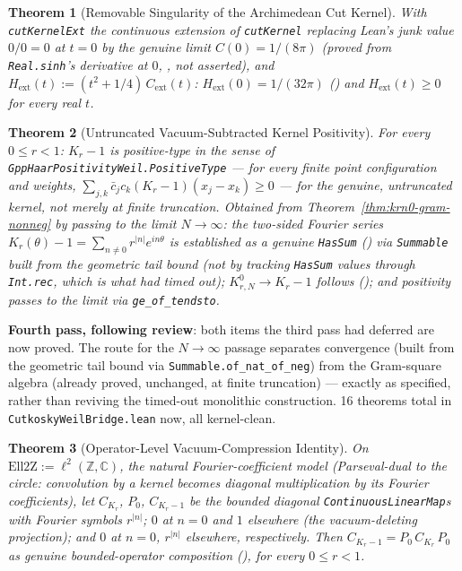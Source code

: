 \documentclass{report}
\newtheorem{theorem}{Theorem}[chapter]
\theoremstyle{definition}
\begin{document}
\begin{theorem}[Removable Singularity of the Archimedean Cut Kernel]
  \label{thm:hext-nonneg}
  \leanok
  With \texttt{cutKernelExt} the continuous extension of \texttt{cutKernel} replacing
  Lean's junk value $0/0=0$ at $t=0$ by the genuine limit $C(0)=1/(8\pi)$ (proved from
  \texttt{Real.sinh}'s derivative at $0$, ,
  not asserted), and $H_{\mathrm{ext}}(t):=(t^2+1/4)\,C_{\mathrm{ext}}(t)$: $H_{\mathrm{ext}}(0)
  =1/(32\pi)$ () and $H_{\mathrm{ext}}(t)\geq0$ for every
  real $t$.
\end{theorem}

\begin{theorem}[Untruncated Vacuum-Subtracted Kernel Positivity]
  \label{thm:krclosed-minus-one-positivetype}
  \leanok
  For every $0\le r<1$: $K_r-1$ is positive-type in the sense of
  \texttt{GppHaarPositivityWeil.PositiveType} --- for every finite point configuration
  and weights, $\sum_{j,k}\bar c_jc_k(K_r-1)(x_j-x_k)\geq0$ --- for the genuine,
  untruncated kernel, not merely at finite truncation. Obtained from
  Theorem~\ref{thm:krn0-gram-nonneg} by passing to the limit $N\to\infty$: the two-sided
  Fourier series $K_r(\theta)-1=\sum_{n\ne0}r^{|n|}e^{in\theta}$ is established as a
  genuine \texttt{HasSum} () via
  \texttt{Summable} built from the geometric tail bound (not by tracking \texttt{HasSum}
  values through \texttt{Int.rec}, which is what had timed out); $K^0_{r,N}\to K_r-1$
  follows (); and positivity passes to the limit via
  \texttt{ge\_of\_tendsto}.
\end{theorem}

\textbf{Fourth pass, following review}: both items the third pass had deferred are now
proved. The route for the $N\to\infty$ passage separates convergence (built from the
geometric tail bound via \texttt{Summable.of\_nat\_of\_neg}) from the Gram-square
algebra (already proved, unchanged, at finite truncation) --- exactly as specified,
rather than reviving the timed-out monolithic construction. 16 theorems total in
\texttt{CutkoskyWeilBridge.lean} now, all kernel-clean.

\begin{theorem}[Operator-Level Vacuum-Compression Identity]
  \label{thm:vacuum-compression-operator-identity}
  \leanok
  On $\mathrm{Ell2Z}:=\ell^2(\mathbb{Z},\mathbb{C})$, the natural Fourier-coefficient
  model (Parseval-dual to the circle: convolution by a kernel becomes diagonal
  multiplication by its Fourier coefficients), let $C_{K_r}$, $P_0$, $C_{K_r-1}$ be the
  bounded diagonal \texttt{ContinuousLinearMap}s with Fourier symbols $r^{|n|}$; $0$ at
  $n=0$ and $1$ elsewhere (the vacuum-deleting projection); and $0$ at $n=0$, $r^{|n|}$
  elsewhere, respectively. Then $C_{K_r-1}=P_0\,C_{K_r}\,P_0$ as genuine bounded-operator
  composition (), for every $0\le r<1$.
\end{theorem}
\end{document}
